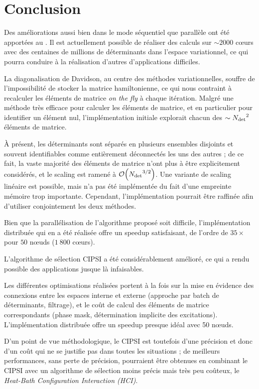 \documentclass[./thesis.tex]{subfiles}
\begin{document}

\section{Conclusion}

Des améliorations aussi bien dans le mode séquentiel que parallèle ont été apportées au \QP. Il est actuellement possible de réaliser des calculs sur $\sim 2000$ cœurs avec des centaines de millions de déterminants dans l'espace variationnel, ce qui pourra conduire à la réalisation d'autres d'applications difficiles.

La diagonalisation de Davidson, au centre des méthodes variationnelles, souffre de l’impossibilité de stocker la matrice hamiltonienne, ce qui nous contraint à recalculer les éléments de matrice \emph{on the fly} à chaque itération. Malgré une méthode très efficace pour calculer les éléments de matrice,\cite{Scemama_2013} et en particulier pour identifier un élément nul, l'implémentation initiale explorait chacun des $\sim {N_\text{det}}^2$ éléments de matrice.

À présent, les déterminants sont séparés en plusieurs ensembles disjoints et souvent identifiables comme entièrement déconnectés les uns des autres ; de ce fait, la vaste majorité des éléments de matrice n'ont plus à être explicitement considérés, et le scaling est ramené à $\order{\Ndet^{3/2}}$. Une variante de scaling linéaire est possible, mais n'a pas été implémentée du fait d'une empreinte mémoire trop importante. Cependant, l'implémentation pourrait être raffinée afin d'utiliser conjointement les deux méthodes.

Bien que la parallélisation de l'algorithme proposé soit difficile, l'implémentation distribuée qui en a été réalisée offre un speedup satisfaisant, de l'ordre de $35\times$ pour $50$ nœuds ($1~800$ cœurs). 

L'algorithme de sélection CIPSI a été considérablement amélioré, ce qui a rendu possible des applications jusque là infaisables.\cite{Scemama_2018,1806.05115}

Les différentes optimisations réalisées portent à la fois sur la mise en évidence des connexions entre les espaces interne et externe (approche par batch de déterminants, filtrage), et le coût de calcul des éléments de matrice correspondants (phase mask, détermination implicite des excitations).
L'implémentation distribuée offre un speedup presque idéal avec 50 nœuds.

D'un point de vue méthodologique, le CIPSI est toutefois d'une précision et donc d'un coût qui ne se justifie pas dans toutes les situations ; de meilleurs performances, sans perte de précision, pourraient être obtenues en combinant le CIPSI avec un algorithme de sélection moins précis mais très peu coûteux, le \emph{Heat-Bath Configuration Interaction (HCI)}. \cite{Holmes_2016, Sharma_2017}
\end{document}
